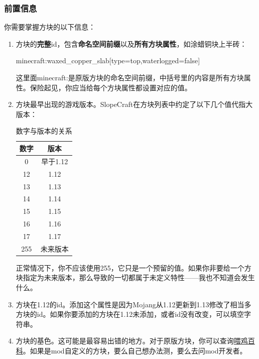 \documentclass[UTF8]{ctexart}
\begin{document}
   \subsubsection{前置信息}
   你需要掌握方块的以下信息：

   \begin{enumerate}
       \item 方块的\textbf{完整}id，包含\textbf{命名空间前缀}以及\textbf{所有方块属性}，如涂蜡铜块上半砖：
       
       minecraft:waxed\_copper\_slab[type=top,waterlogged=false]

       这里面minecraft:是原版方块的命名空间前缀，中括号里的内容是所有方块属性。保险起见，你应当给每个方块属性都设置对应的值。
       \item 方块最早出现的游戏版本。SlopeCraft在方块列表中约定了以下几个值代指大版本：
       \begin{table}[h]
        \centering
        \caption{数字与版本的关系}
        \label{VerAndRealVer}
        \begin{tabular}{cc}\hline
            数字 & 版本 \\ \hline
            0 & 早于1.12 \\
            12 & 1.12 \\
            13 & 1.13 \\
            14 & 1.14 \\
            15 & 1.15 \\
            16 & 1.16 \\
            17 & 1.17 \\
            255 & 未来版本 \\
            \hline            
        \end{tabular}
       \end{table}

   正常情况下，你不应该使用255，它只是一个预留的值。如果你非要给一个方块指定为未来版本，那么导致的一切都属于未定义特性——我也不知道会发生什么。

   \item 方块在1.12的id。添加这个属性是因为Mojang从1.12更新到1.13修改了相当多方块的id。如果你要添加的方块在1.12未添加，或者id没有改变，可以填空字符串。
   \item 方块的基色。这可能是最容易出错的地方。对于原版方块，你可以查询\href{https://wiki.biligame.com/mc/%E5%9C%B0%E5%9B%BE%E7%89%A9%E5%93%81%E6%A0%BC%E5%BC%8F#idcounts.dat_.E6.A0.BC.E5.BC.8F}{喂鸡百科}。如果是mod自定义的方块，要么自己想办法测，要么去问mod开发者。
   

\end{enumerate}
\end{document}
